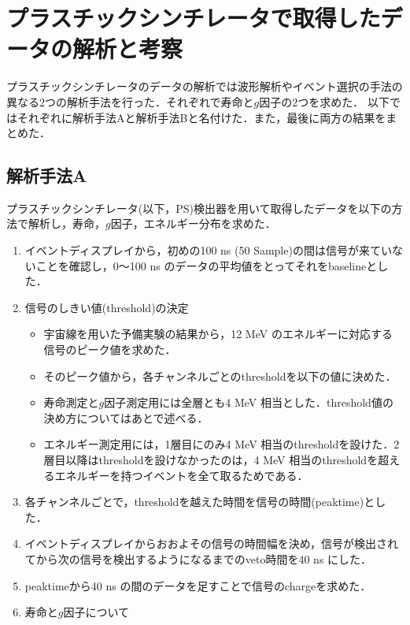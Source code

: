  \section{プラスチックシンチレータで取得したデータの解析と考察}
 プラスチックシンチレータのデータの解析では波形解析やイベント選択の手法の異なる2つの解析手法を行った．それぞれで寿命と$g$因子の2つを求めた．
 以下ではそれぞれに解析手法Aと解析手法Bと名付けた．また，最後に両方の結果をまとめた．
 
  \subsection{解析手法A}
  プラスチックシンチレータ(以下，PS)検出器を用いて取得したデータを以下の方法で解析し，寿命，$g$因子，エネルギー分布を求めた．
  \begin{enumerate}
   \item イベントディスプレイから，初めの100 ns (50 Sample)の間は信号が来ていないことを確認し，0〜100 ns のデータの平均値をとってそれをbaselineとした．
   \item 信号のしきい値(threshold)の決定
	 \begin{itemize}
	  \item 宇宙線を用いた予備実験の結果から，12 MeV のエネルギーに対応する信号のピーク値を求めた．%
	  \item そのピーク値から，各チャンネルごとのthresholdを以下の値に決めた．
	  \item 寿命測定と$g$因子測定用には全層とも4 MeV 相当とした．threshold値の決め方についてはあとで述べる．
	  \item エネルギー測定用には，1層目にのみ4 MeV 相当のthresholdを設けた．2層目以降はthresholdを設けなかったのは，4 MeV 相当のthresholdを超えるエネルギーを持つイベントを全て取るためである．
	 \end{itemize}
   \item 各チャンネルごとで，thresholdを越えた時間を信号の時間(peaktime)とした．
   \item イベントディスプレイからおおよその信号の時間幅を決め，信号が検出されてから次の信号を検出するようになるまでのveto時間を40 ns にした．
   \item peaktimeから40 ns の間のデータを足すことで信号のchargeを求めた．
   \item 寿命と$g$因子について

\end{enumerate}
